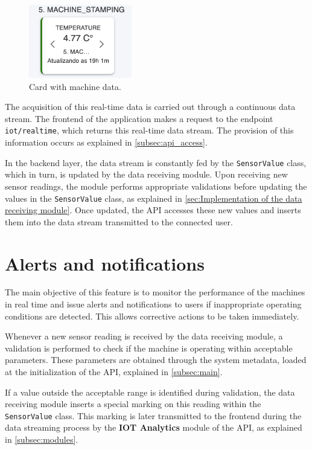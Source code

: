 \begin{figure}[htbp]
	\centering
	\includegraphics[width=0.4\textwidth]{images/machineCard.png}
	\caption{Card with machine data.}
	\label{fig:cardData}
\end{figure}

The acquisition of this real-time data is carried out through a continuous data stream. The frontend of the application makes a request to the endpoint \texttt{iot/realtime}, which returns this real-time data stream. The provision of this information occurs as explained in \ref{subsec:api_access}.

In the backend layer, the data stream is constantly fed by the \texttt{SensorValue} class, which in turn, is updated by the data receiving module. Upon receiving new sensor readings, the module performs appropriate validations before updating the values in the \texttt{SensorValue} class, as explained in \ref{sec:Implementation of the data receiving module}. Once updated, the \gls{API} accesses these new values and inserts them into the data stream transmitted to the connected user.


\section[Alerts and notifications]{Alerts and notifications}\label{sec:alertsAndNotifications}

The main objective of this feature is to monitor the performance of the machines in real time and issue alerts and notifications to users if inappropriate operating conditions are detected. This allows corrective actions to be taken immediately.

Whenever a new sensor reading is received by the data receiving module, a validation is performed to check if the machine is operating within acceptable parameters. These parameters are obtained through the system metadata, loaded at the initialization of the \gls{API}, explained in \ref{subsec:main}.

If a value outside the acceptable range is identified during validation, the data receiving module inserts a special marking on this reading within the \texttt{SensorValue} class. This marking is later transmitted to the frontend during the data streaming process by the \textbf{IOT Analytics} module of the \gls{API}, as explained in \ref{subsec:modules}.

